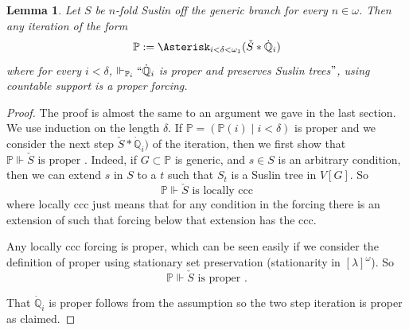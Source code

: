 \documentclass[a4paper,11pt]{article}
\newtheorem{lemma}[theorem]{Lemma}
\newcommand{\forceP}{\mathbb{P}}
\newcommand{\forceQ}{\mathbb{Q}}
\begin{document}


\begin{lemma}
Let $S$ be $n$-fold Suslin off the generic branch for every $n \in \omega$. 
Then any iteration of the form
\[ \forceP:= \Asterisk_{i < \delta < \omega_1} (\check{S} \ast \dot{\forceQ}_i) \]
where for every $i < \delta$, $\Vdash_{\forceP_i} ``\dot{\forceQ}_i$ is proper and preserves Suslin trees$"$, using countable support is a proper forcing.
\end{lemma}
\begin{proof}
The proof is almost the same to an argument we gave in the last section.
We use induction on the length $\delta$. If $\forceP= (\forceP(i) \mid i < \delta)$
is proper and we consider the next step $\check{S} \ast \dot{\forceQ}_i)$
of the iteration, then we first show that
$ \forceP \Vdash \check{S} \text{ is proper } .$
Indeed, if $G \subset \forceP$ is generic, and $s \in S$ is an arbitrary condition, then we can extend $s$ in $S$ to a $t$ such that $S_t$ is a Suslin tree in $V[G]$. So 
\[ \forceP \Vdash \check{S} \text{ is locally ccc} \]
where locally ccc just means that for any condition in the forcing there is an extension of such that forcing below that extension has the ccc. 

Any locally ccc forcing is proper, which can be seen easily if we consider the definition of proper using stationary set preservation (stationarity in $[\lambda]^{\omega}$).
So 
\[\forceP \Vdash \check{S} \text{ is proper }. \]

That $\dot{\forceQ}_i$ is proper follows from the assumption so the two step iteration is proper as claimed.


\end{proof}
\end{document}
